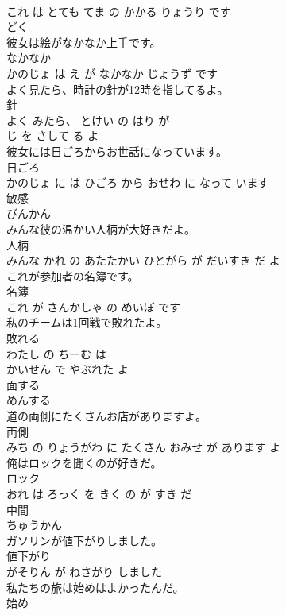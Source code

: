 \documentclass[8pt]{extreport}
\begin{document}
\begin{CJK}{UTF8}{min}
\\	これ は とても てま の かかる りょうり です			
\\	どく	
\\	彼女は絵がなかなか上手です。	
\\	なかなか 
\\	かのじょ は え が なかなか じょうず です			
\\	よく見たら、時計の針が12時を指してるよ。	
\\	針 
\\	よく みたら、 とけい の はり が 
\\	じ を さして る よ			
\\	彼女には日ごろからお世話になっています。	
\\	日ごろ 
\\	かのじょ に は ひごろ から おせわ に なって います			
\\	敏感	
\\	びんかん			
\\	みんな彼の温かい人柄が大好きだよ。	
\\	人柄 
\\	みんな かれ の あたたかい ひとがら が だいすき だ よ			
\\	これが参加者の名簿です。	
\\	名簿 
\\	これ が さんかしゃ の めいぼ です			
\\	私のチームは1回戦で敗れたよ。	
\\	敗れる 
\\	わたし の ちーむ は 
\\	かいせん で やぶれた よ			
\\	面する	
\\	めんする			
\\	道の両側にたくさんお店がありますよ。	
\\	両側 
\\	みち の りょうがわ に たくさん おみせ が あります よ			
\\	俺はロックを聞くのが好きだ。	
\\	ロック 
\\	おれ は ろっく を きく の が すき だ			
\\	中間	
\\	ちゅうかん			
\\	ガソリンが値下がりしました。	
\\	値下がり 
\\	がそりん が ねさがり しました			
\\	私たちの旅は始めはよかったんだ。	
\\	始め 

\end{CJK}
\end{document}
